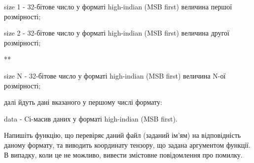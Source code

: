 \documentclass[]{article}
\begin{document}
\begin{enumerate}
size 1 - 32-бітове число у форматі high-indian (MSB first) величина
першої розмірності;

size 2 - 32-бітове число у форматі high-indian (MSB first) величина
другої розмірності;

**

size N - 32-бітове число у форматі high-indian (MSB first) величина N-ої
розмірності;

далі йдуть дані вказаного у першому числі формату:

data - Cі-масив даних у форматі high-indian (MSB first).

Напишіть функцію, що перевіряє даний файл (заданий ім'ям) на
відповідність даному формату, та виводить координату тензору, що задана
аргументом функції. В випадку, коли це не можливо, вивести змістовне
повідомлення про помилку.
\end{enumerate}
\end{document}

